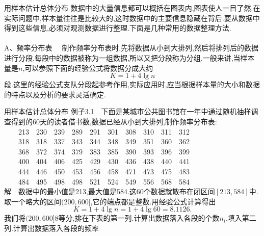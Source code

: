 \begin{frame}{用样本估计总体分布}
数据中的大量信息都可以概括在图表内,图表使人一目了然.在实际问题中,样本量往往是比较大的,这时数据中的主要信息隐藏在背后.要从数据中得到这些信息,必须对观测数据进行整理.下面是几种常用的数据整理方法.
\\ \hspace*{\fill} \\
\alert{A、频率分布表}
$\quad$制作频率分布表时,先将数据从小到大排列,然后将排列后的数据进行分段.每段中的数据被称为一组数据,所以又把分段称为\alert{分组}.一般来讲,当样本量是$n$,可以参照下面的经验公式将数据分成大约
\begin{equation}
K = 1 + 4\lg n
\end{equation}
段.这里的经验公式支队分段起参考作用,实际应用时,应当根据样本量的大小和数据的特点以及分析的要求灵活确定.
\end{frame}

\begin{frame}{用样本估计总体分布}
例子3.1$\quad$下面是某城市公共图书馆在一年中通过随机抽样调查得到的60天的读者借书数,数据已经从小到大排列,制作频率分布表:\\
$\quad$$\quad$213$\quad$230$\quad$239$\quad$289$\quad$291$\quad$301$\quad$308$\quad$310$\quad$311$\quad$312\\
$\quad$$\quad$318$\quad$318$\quad$337$\quad$343$\quad$344$\quad$348$\quad$349$\quad$351$\quad$360$\quad$362\\
$\quad$$\quad$368$\quad$372$\quad$374$\quad$379$\quad$383$\quad$385$\quad$390$\quad$393$\quad$396$\quad$399\\
$\quad$$\quad$400$\quad$404$\quad$406$\quad$425$\quad$429$\quad$430$\quad$436$\quad$438$\quad$440$\quad$441\\
$\quad$$\quad$444$\quad$446$\quad$450$\quad$453$\quad$456$\quad$458$\quad$471$\quad$473$\quad$475$\quad$483\\
$\quad$$\quad$484$\quad$495$\quad$498$\quad$498$\quad$521$\quad$524$\quad$549$\quad$556$\quad$568$\quad$584\\
解$\quad$数据中的最小值是213,最大值是584.这60个数据就散布在闭区间$[213,584]$中.取一个略大的区间$(200,600]$,它的端点都是整数.用经验公式计算得出
\begin{equation*}
K = 1 + 4\lg n = 1 + 4\lg 60 = 8.1126.
\end{equation*}
我们将$(200,600]$8等分,排在下表的第一列.计算出数据落入各段的个数$n_i$,填入第二列.计算出数据落入各段的频率
\end{frame}

